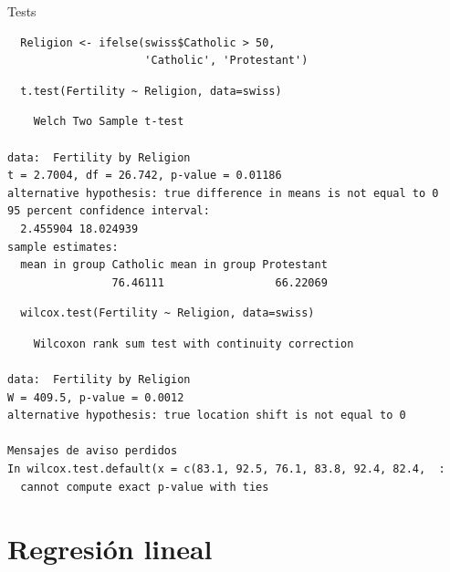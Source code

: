 \documentclass[xcolor={usenames,svgnames,dvipsnames}]{beamer}
\begin{document}
\begin{frame}[fragile,label=sec-2-8]{Tests}
 \lstset{language=R,label= ,caption= ,numbers=none}
\begin{lstlisting}
  Religion <- ifelse(swiss$Catholic > 50,
                     'Catholic', 'Protestant')
\end{lstlisting}

\lstset{language=R,label= ,caption= ,numbers=none}
\begin{lstlisting}
  t.test(Fertility ~ Religion, data=swiss)
\end{lstlisting}

\begin{verbatim}
	Welch Two Sample t-test

data:  Fertility by Religion
t = 2.7004, df = 26.742, p-value = 0.01186
alternative hypothesis: true difference in means is not equal to 0
95 percent confidence interval:
  2.455904 18.024939
sample estimates:
  mean in group Catholic mean in group Protestant 
                76.46111                 66.22069
\end{verbatim}

\lstset{language=R,label= ,caption= ,numbers=none}
\begin{lstlisting}
  wilcox.test(Fertility ~ Religion, data=swiss)
\end{lstlisting}

\begin{verbatim}
	Wilcoxon rank sum test with continuity correction

data:  Fertility by Religion
W = 409.5, p-value = 0.0012
alternative hypothesis: true location shift is not equal to 0

Mensajes de aviso perdidos
In wilcox.test.default(x = c(83.1, 92.5, 76.1, 83.8, 92.4, 82.4,  :
  cannot compute exact p-value with ties
\end{verbatim}
\end{frame}

\section{Regresión lineal}
\label{sec-3}
\end{document}
